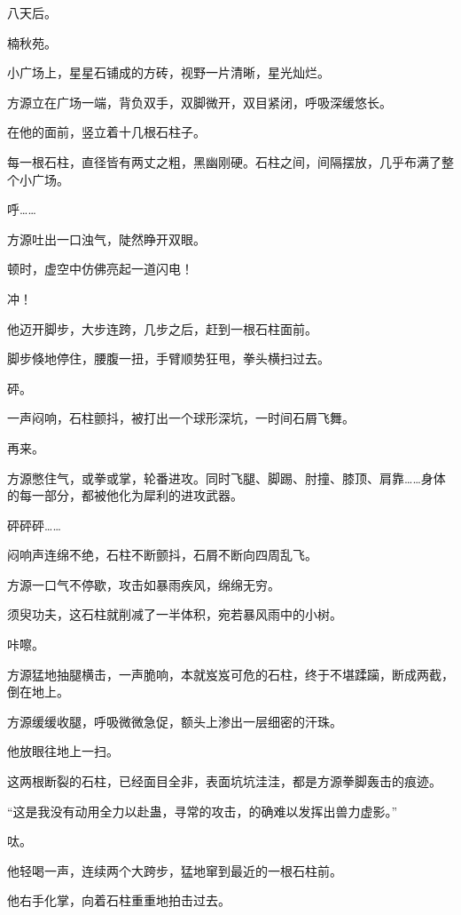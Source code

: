 
\begin{this_body}

八天后。

楠秋苑。

小广场上，星星石铺成的方砖，视野一片清晰，星光灿烂。

方源立在广场一端，背负双手，双脚微开，双目紧闭，呼吸深缓悠长。

在他的面前，竖立着十几根石柱子。

每一根石柱，直径皆有两丈之粗，黑幽刚硬。石柱之间，间隔摆放，几乎布满了整个小广场。

呼……

方源吐出一口浊气，陡然睁开双眼。

顿时，虚空中仿佛亮起一道闪电！

冲！

他迈开脚步，大步连跨，几步之后，赶到一根石柱面前。

脚步倏地停住，腰腹一扭，手臂顺势狂甩，拳头横扫过去。

砰。

一声闷响，石柱颤抖，被打出一个球形深坑，一时间石屑飞舞。

再来。

方源憋住气，或拳或掌，轮番进攻。同时飞腿、脚踢、肘撞、膝顶、肩靠……身体的每一部分，都被他化为犀利的进攻武器。

砰砰砰……

闷响声连绵不绝，石柱不断颤抖，石屑不断向四周乱飞。

方源一口气不停歇，攻击如暴雨疾风，绵绵无穷。

须臾功夫，这石柱就削减了一半体积，宛若暴风雨中的小树。

咔嚓。

方源猛地抽腿横击，一声脆响，本就岌岌可危的石柱，终于不堪蹂躏，断成两截，倒在地上。

方源缓缓收腿，呼吸微微急促，额头上渗出一层细密的汗珠。

他放眼往地上一扫。

这两根断裂的石柱，已经面目全非，表面坑坑洼洼，都是方源拳脚轰击的痕迹。

“这是我没有动用全力以赴蛊，寻常的攻击，的确难以发挥出兽力虚影。”

呔。

他轻喝一声，连续两个大跨步，猛地窜到最近的一根石柱前。

他右手化掌，向着石柱重重地拍击过去。


\end{this_body}
